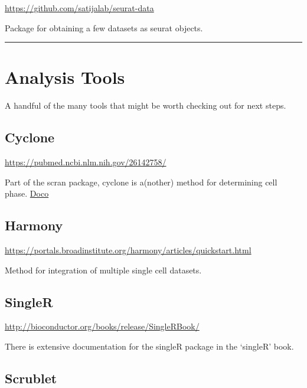 \documentclass[
]{book}
\begin{document}
\url{https://github.com/satijalab/seurat-data}

Package for obtaining a few datasets as seurat objects.

\begin{center}\rule{0.5\linewidth}{0.5pt}\end{center}

\hypertarget{analysis-tools}{%
\section{Analysis Tools}\label{analysis-tools}}

A handful of the many tools that might be worth checking out for next steps.

\hypertarget{cyclone}{%
\subsection*{Cyclone}\label{cyclone}}

\url{https://pubmed.ncbi.nlm.nih.gov/26142758/}

Part of the scran package, cyclone is a(nother) method for determining cell phase.
\href{https://rdrr.io/bioc/scran/man/cyclone.html}{Doco}

\hypertarget{harmony}{%
\subsection*{Harmony}\label{harmony}}

\url{https://portals.broadinstitute.org/harmony/articles/quickstart.html}

Method for integration of multiple single cell datasets.

\hypertarget{singler-1}{%
\subsection*{SingleR}\label{singler-1}}

\url{http://bioconductor.org/books/release/SingleRBook/}

There is extensive documentation for the singleR package in the `singleR' book.

\hypertarget{scrublet}{%
\subsection*{Scrublet}\label{scrublet}}
\end{document}
